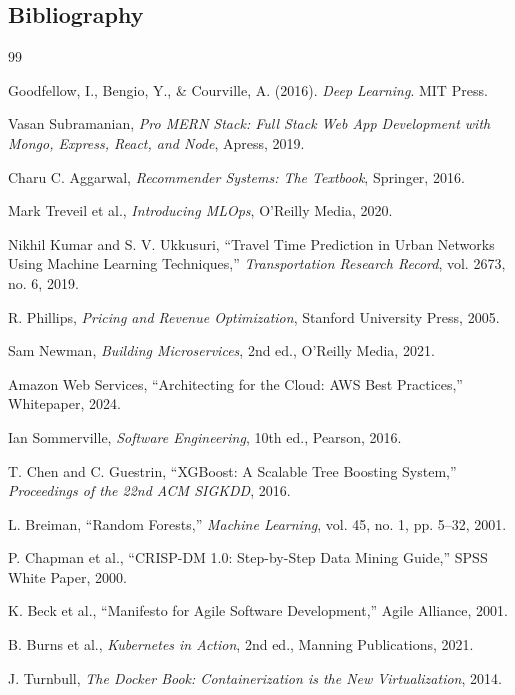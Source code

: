 \documentclass[12pt,a4paper]{report}
\begin{document}
\begin{itemize}
\chapter{Bibliography}

\begin{thebibliography}{99}

 Goodfellow, I., Bengio, Y., \& Courville, A. (2016). \textit{Deep Learning}. MIT Press.

 Vasan Subramanian, \textit{Pro MERN Stack: Full Stack Web App Development with Mongo, Express, React, and Node}, Apress, 2019.

 Charu C. Aggarwal, \textit{Recommender Systems: The Textbook}, Springer, 2016.

 Mark Treveil et al., \textit{Introducing MLOps}, O'Reilly Media, 2020.

 Nikhil Kumar and S. V. Ukkusuri, ``Travel Time Prediction in Urban Networks Using Machine Learning Techniques,'' \textit{Transportation Research Record}, vol. 2673, no. 6, 2019.

 R. Phillips, \textit{Pricing and Revenue Optimization}, Stanford University Press, 2005.

 Sam Newman, \textit{Building Microservices}, 2nd ed., O'Reilly Media, 2021.

 Amazon Web Services, ``Architecting for the Cloud: AWS Best Practices,'' Whitepaper, 2024.

 Ian Sommerville, \textit{Software Engineering}, 10th ed., Pearson, 2016.

 T. Chen and C. Guestrin, ``XGBoost: A Scalable Tree Boosting System,'' \textit{Proceedings of the 22nd ACM SIGKDD}, 2016.

 L. Breiman, ``Random Forests,'' \textit{Machine Learning}, vol. 45, no. 1, pp. 5--32, 2001.

 P. Chapman et al., ``CRISP-DM 1.0: Step-by-Step Data Mining Guide,'' SPSS White Paper, 2000.

 K. Beck et al., ``Manifesto for Agile Software Development,'' Agile Alliance, 2001.

 B. Burns et al., \textit{Kubernetes in Action}, 2nd ed., Manning Publications, 2021.

 J. Turnbull, \textit{The Docker Book: Containerization is the New Virtualization}, 2014.


\end{thebibliography}
\end{itemize}
\end{document}
